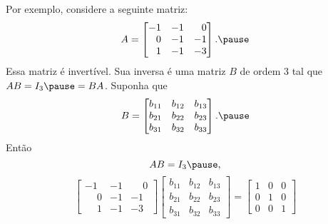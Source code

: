 \documentclass{beamer}
\begin{document}
    \begin{frame}
        Por exemplo, considere a seguinte matriz:
        \[
        A = \begin{bmatrix}
            -1 & -1 & \phantom{-} 0\\
            \phantom{-} 0 & -1 & -1\\
            \phantom{-} 1 & -1 & -3
        \end{bmatrix}.\pause
        \]
        Essa matriz é invertível. \pause Sua inversa é uma matriz $B$ de ordem 3 \pause tal que $AB = I_3 \pause = BA$. \pause Suponha que
        \[
        B = \begin{bmatrix}
            b_{11} & b_{12} & b_{13}\\
            b_{21} & b_{22} & b_{23}\\
            b_{31} & b_{32} & b_{33}
        \end{bmatrix}.\pause
        \]
        Então\pause
        \[
        AB = I_3\pause,
        \]
        \[
        \begin{bmatrix}-1 & -1 & \phantom{-} 0\\\phantom{-} 0 & -1 & -1\\\phantom{-} 1 & -1 & -3\end{bmatrix}\begin{bmatrix}b_{11} & b_{12} & b_{13}\\b_{21} & b_{22} & b_{23}\\b_{31} & b_{32} & b_{33}\end{bmatrix} = \begin{bmatrix}
            1 & 0 & 0\\0 & 1 & 0\\0 & 0 & 1
        \end{bmatrix}
        \]
    \end{frame}
\end{document}
